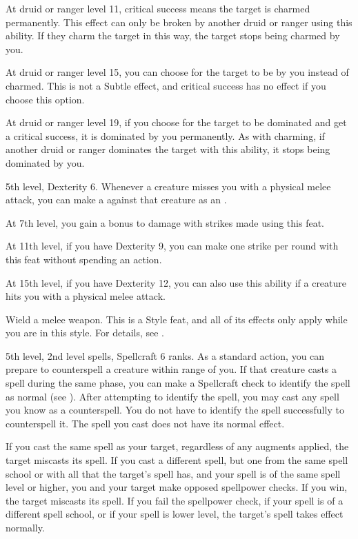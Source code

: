     At druid or ranger level 11, critical success means the target is charmed permanently.
    This effect can only be broken by another druid or ranger using this ability.
    If they charm the target in this way, the target stops being charmed by you.

    At druid or ranger level 15, you can choose for the target to be \dominated by you instead of charmed.
    This is not a Subtle effect, and critical success has no effect if you choose this option.

    At druid or ranger level 19, if you choose for the target to be dominated and get a critical success, it is dominated by you permanently.
    As with charming, if another druid or ranger dominates the target with this ability, it stops being dominated by you.

    \featpres 5th level, Dexterity 6.
    \featben Whenever a creature misses you with a physical melee attack, you can make a  against that creature as an .

    At 7th level, you gain a  bonus to damage with strikes made using this feat.

    At 11th level, if you have Dexterity 9, you can make one strike per round with this feat without spending an action.

    At 15th level, if you have Dexterity 12, you can also use this ability if a creature hits you with a physical melee attack.

    \stylereq Wield a melee weapon.
     This is a Style feat, and all of its effects only apply while you are in this style.
    For details, see .

    \featpres 5th level, 2nd level spells, Spellcraft 6 ranks.
    \featben As a standard action, you can prepare to counterspell a creature within \rngmed range of you.
    If that creature casts a spell during the same phase, you can make a Spellcraft check to identify the spell as normal (see ).
    After attempting to identify the spell, you may cast any spell you know as a counterspell.
    You do not have to identify the spell successfully to counterspell it.
    The spell you cast does not have its normal effect.

    If you cast the same spell as your target, regardless of any augments applied, the target miscasts its spell.
    If you cast a different spell, but one from the same spell school or with all  that the target's spell has, and your spell is of the same spell level or higher, you and your target make opposed spellpower checks.
    If you win, the target miscasts its spell.
    If you fail the spellpower check, if your spell is of a different spell school, or if your spell is lower level, the target's spell takes effect normally.

